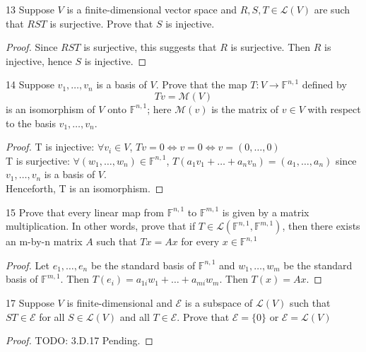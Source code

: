 \documentclass{article}
\newenvironment{problem}[1]{\begin{prob*}{#1}{}}{\end{prob*}}
\begin{document}
\begin{problem}{13}
Suppose $V$ is a finite-dimensional vector space and $R,S,T \in \mathcal{L}(V)$ are such that $RST$ is surjective. Prove that $S$ is injective.
\end{problem}
\begin{proof}
	Since $RST$ is surjective, this suggests that $R$ is surjective. Then $R$ is injective, hence $S$ is injective.
\end{proof}

\begin{problem}{14}
Suppose $v_1, \ldots ,v_n$ is a basis of $V$. Prove that the map $T: V \to \mathbb{F}^{n,1}$ defined by \[
	Tv = \mathcal{M}(V)\]
is an isomorphism of $V$ onto $\mathbb{F}^{n,1}$; here $\mathcal{M}(v)$ is the matrix of $v \in V$ with respect to the basis $v_1, \ldots, v_n.$
\end{problem}
\begin{proof}
	T is injective: $\forall v_i \in  V$, $Tv = 0 \iff v = 0 \iff v = (0, \ldots ,0)$ \\
	T is surjective: $\forall (w_1, \ldots ,w_n) \in \mathbb{F}^{n,1}$, $T(a_1v_1 + \ldots + a_nv_n) = (a_1, \ldots ,a_n)$ since $v_1, \ldots ,v_n$ is a basis of $V$. \\
	Henceforth, T is an isomorphism.
\end{proof}

\begin{problem}{15}
Prove that every linear map from $\mathbb{F}^{n,1}$ to $\mathbb{F}^{m,1}$ is given by a matrix multiplication. In other words, prove that if $T \in \mathcal{L}(\mathbb{F}^{n,1}, \mathbb{F}^{m,1})$, then there exists an m-by-n matrix $A$ such that $Tx = Ax$ for every $x \in \mathbb{F}^{n,1}$
\end{problem}
\begin{proof}
	Let $e_1, \ldots ,e_n$ be the standard basis of $\mathbb{F}^{n,1}$ and $w_1, \ldots ,w_m$ be the standard basis of $\mathbb{F}^{m,1}$. Then $T(e_i) = a_{1i}w_1 + \ldots + a_{mi}w_m$. Then $T(x) = Ax$.
\end{proof}

\begin{problem}{17}
Suppose $V$ is finite-dimensional and $\mathcal{E}$ is a subspace of $\mathcal{L}(V)$ such that $ST \in \mathcal{E}$ for all $S \in \mathcal{L}(V)$ and all $T \in \mathcal{E}$. Prove that $\mathcal{E} = \{0\}$ or $\mathcal{E} = \mathcal{L}(V)$
\end{problem}
\begin{proof}
TODO: 3.D.17 Pending.
\end{proof}
\end{document}
